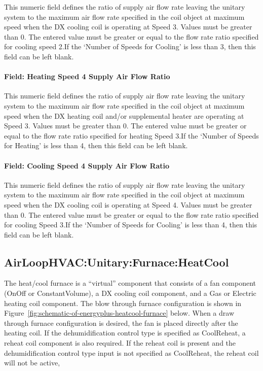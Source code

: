 This numeric field defines the ratio of supply air flow rate leaving the unitary system to the maximum air flow rate specified in the coil object at maximum speed when the DX cooling coil is operating at Speed 3. Values must be greater than 0. The entered value must be greater or equal to the flow rate ratio specified for cooling speed 2.If the `Number of Speeds for Cooling' is less than 3, then this field can be left blank.

\paragraph{Field: Heating Speed 4 Supply Air Flow Ratio}\label{field-heating-speed-4-supply-air-flow-ratio}

This numeric field defines the ratio of supply air flow rate leaving the unitary system to the maximum air flow rate specified in the coil object at maximum speed when the DX heating coil and/or supplemental heater are operating at Speed 3. Values must be greater than 0. The entered value must be greater or equal to the flow rate ratio specified for heating Speed 3.If the `Number of Speeds for Heating' is less than 4, then this field can be left blank.

\paragraph{Field: Cooling Speed 4 Supply Air Flow Ratio}\label{field-cooling-speed-4-supply-air-flow-ratio}

This numeric field defines the ratio of supply air flow rate leaving the unitary system to the maximum air flow rate specified in the coil object at maximum speed when the DX cooling coil is operating at Speed 4. Values must be greater than 0. The entered value must be greater or equal to the flow rate ratio specified for cooling Speed 3.If the `Number of Speeds for Cooling' is less than 4, then this field can be left blank.

\subsection{AirLoopHVAC:Unitary:Furnace:HeatCool}\label{airloophvacunitaryfurnaceheatcool}

The heat/cool furnace is a ``virtual'' component that consists of a fan component (OnOff or ConstantVolume), a DX cooling coil component, and a Gas or Electric heating coil component. The blow through furnace configuration is shown in Figure~\ref{fig:schematic-of-energyplus-heatcool-furnace} below. When a draw through furnace configuration is desired, the fan is placed directly after the heating coil. If the dehumidification control type is specified as CoolReheat, a reheat coil component is also required. If the reheat coil is present and the dehumidification control type input is not specified as CoolReheat, the reheat coil will not be active,

